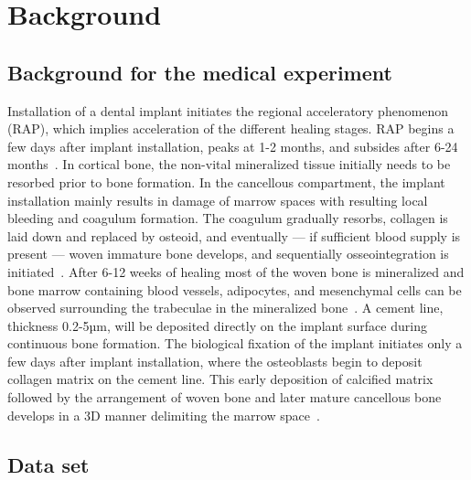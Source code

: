 \section{Background}
\label{sec:background}


\subsection{Background for the medical experiment}
Installation of a dental implant initiates the regional acceleratory phenomenon (RAP), which
implies acceleration of the different healing stages. RAP begins a few days after implant
installation, peaks at 1-2 months, and subsides after 6-24 months~\cite{frost1989}. In cortical bone,
the non-vital mineralized tissue initially needs to be resorbed prior to bone formation. In the
cancellous compartment, the implant installation mainly results in damage of marrow spaces with
resulting local bleeding and coagulum formation. The coagulum gradually resorbs, collagen is laid
down and replaced by osteoid, and eventually --- if sufficient blood supply is present --- woven immature
bone develops, and sequentially osseointegration is initiated~\cite{frost1989}. After 6-12 weeks of
healing most of the woven bone is mineralized and bone marrow containing blood vessels, adipocytes,
and mesenchymal cells can be observed surrounding the trabeculae in the mineralized bone~\cite{Berglundh2003, Abrahamsson2004}.
A cement line, thickness  0.2-5µm, will be deposited
directly on the implant surface during continuous bone formation. The biological fixation of the
implant initiates only a few days after implant installation, where the osteoblasts begin to deposit
collagen matrix on the cement line. This early deposition of calcified matrix followed by the
arrangement of woven bone and later mature cancellous bone develops in a 3D manner delimiting the
marrow space~\cite{Franchi2004}.

\subsection{Data set}

